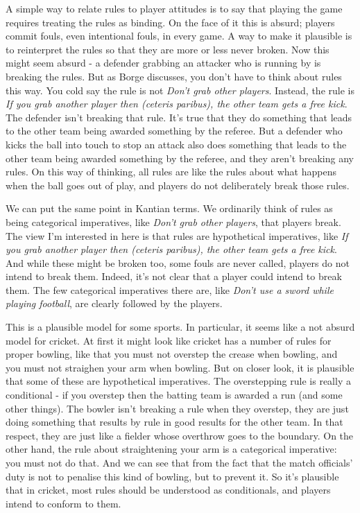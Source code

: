\documentclass[
  11pt,
  letterpaper,
  DIV=11,
  numbers=noendperiod,
  oneside]{scrartcl}
\begin{document}
A simple way to relate rules to player attitudes is to say that playing
the game requires treating the rules as binding. On the face of it this
is absurd; players commit fouls, even intentional fouls, in every game.
A way to make it plausible is to reinterpret the rules so that they are
more or less never broken. Now this might seem absurd - a defender
grabbing an attacker who is running by is breaking the rules. But as
Borge discusses, you don't have to think about rules this way.
You cold say the rule is not \emph{Don't grab other players}. Instead,
the rule is \emph{If you grab another player then (ceteris paribus), the
other team gets a free kick}. The defender isn't breaking that rule.
It's true that they do something that leads to the other team being
awarded something by the referee. But a defender who kicks the ball into
touch to stop an attack also does something that leads to the other team
being awarded something by the referee, and they aren't breaking any
rules. On this way of thinking, all rules are like the rules about what
happens when the ball goes out of play, and players do not deliberately
break those rules.

We can put the same point in Kantian terms. We ordinarily think of rules
as being categorical imperatives, like \emph{Don't grab other players},
that players break. The view I'm interested in here is that rules are
hypothetical imperatives, like \emph{If you grab another player then
(ceteris paribus), the other team gets a free kick}. And while these
might be broken too, some fouls are never called, players do not intend
to break them. Indeed, it's not clear that a player could intend to
break them. The few categorical imperatives there are, like \emph{Don't
use a sword while playing football}, are clearly followed by the
players.

This is a plausible model for some sports. In particular, it seems like
a not absurd model for cricket. At first it might look like cricket has
a number of rules for proper bowling, like that you must not overstep
the crease when bowling, and you must not straighen your arm when
bowling. But on closer look, it is plausible that some of these are
hypothetical imperatives. The overstepping rule is really a conditional
- if you overstep then the batting team is awarded a run (and some other
things). The bowler isn't breaking a rule when they overstep, they are
just doing something that results by rule in good results for the other
team. In that respect, they are just like a fielder whose overthrow goes
to the boundary. On the other hand, the rule about straightening your
arm is a categorical imperative: you must not do that. And we can see
that from the fact that the match officials' duty is not to penalise
this kind of bowling, but to prevent it. So it's plausible that in
cricket, most rules should be understood as conditionals, and players
intend to conform to them.
\end{document}
